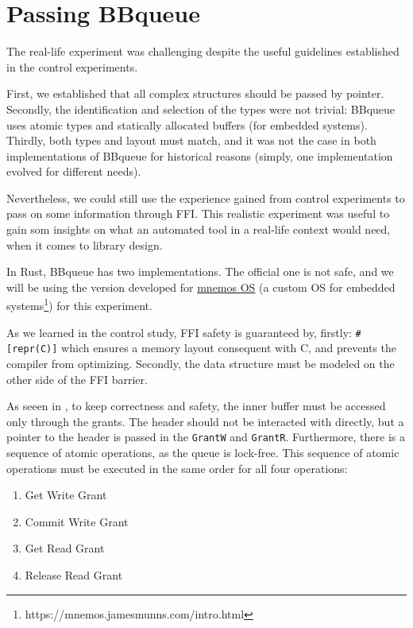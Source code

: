 \documentclass[nomenclature, english, bibtex]{kththesis}
\begin{document}
\section{Passing BBqueue}

The real-life experiment was challenging despite the useful guidelines established in the control experiments.

First, we established that all complex structures should be passed by pointer.
Secondly, the identification and selection of the types were not trivial: BBqueue uses atomic types and statically allocated buffers (for embedded systems).
Thirdly, both types and layout must match, and it was not the case in both implementations of BBqueue for historical reasons (simply, one implementation evolved for different needs).

Nevertheless, we could still use the experience gained from control experiments to pass on some information through FFI. This realistic experiment was useful to gain som insights on what an automated tool in a real-life context would need, when it comes to library design.

In Rust, BBqueue has two implementations. The official one is not  safe, and we will be using the version developed for \href{https://github.com/tosc-rs/mnemos/tree/main/source/abi/src/bbqueue_ipc}{mnemos OS} (a custom OS for embedded systems\footnote{https://mnemos.jamesmunns.com/intro.html}) for this experiment.  

As we learned in the control study,  FFI safety is guaranteed by, firstly:  \texttt{\#[repr(C)]} which ensures a memory layout consequent with C, and prevents the compiler from optimizing. Secondly, the data structure must be modeled on the other side of the FFI barrier.

As seeen in , to keep correctness and safety, the inner buffer must be accessed only through the grants. The header should not be interacted with directly, but a pointer to the header is passed in the  \texttt{GrantW} and \texttt{GrantR}. Furthermore, there is a sequence of atomic operations, as the queue is lock-free. This sequence of atomic operations must be executed in the same order for all four operations:
\begin{enumerate}
    \item Get Write Grant
    \item Commit Write Grant
    \item Get Read Grant
    \item Release Read Grant
\end{enumerate}
   
\end{document}
